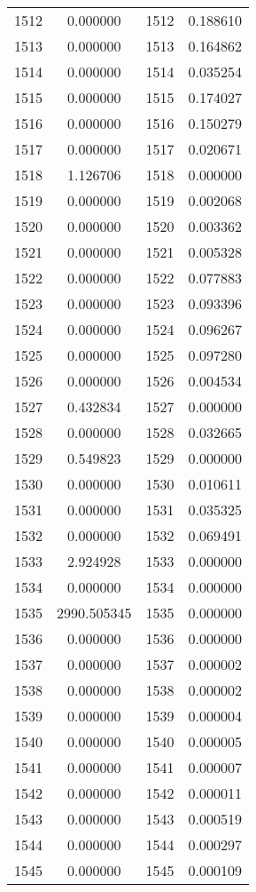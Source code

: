 \documentclass[12pt]{article}
\begin{document}
\begin{longtable}{@{}cccc@{}}
1512 & 0.000000 & 1512 & 0.188610 \\
1513 & 0.000000 & 1513 & 0.164862 \\
1514 & 0.000000 & 1514 & 0.035254 \\
1515 & 0.000000 & 1515 & 0.174027 \\
1516 & 0.000000 & 1516 & 0.150279 \\
1517 & 0.000000 & 1517 & 0.020671 \\
1518 & 1.126706 & 1518 & 0.000000 \\
1519 & 0.000000 & 1519 & 0.002068 \\
1520 & 0.000000 & 1520 & 0.003362 \\
1521 & 0.000000 & 1521 & 0.005328 \\
1522 & 0.000000 & 1522 & 0.077883 \\
1523 & 0.000000 & 1523 & 0.093396 \\
1524 & 0.000000 & 1524 & 0.096267 \\
1525 & 0.000000 & 1525 & 0.097280 \\
1526 & 0.000000 & 1526 & 0.004534 \\
1527 & 0.432834 & 1527 & 0.000000 \\
1528 & 0.000000 & 1528 & 0.032665 \\
1529 & 0.549823 & 1529 & 0.000000 \\
1530 & 0.000000 & 1530 & 0.010611 \\
1531 & 0.000000 & 1531 & 0.035325 \\
1532 & 0.000000 & 1532 & 0.069491 \\
1533 & 2.924928 & 1533 & 0.000000 \\
1534 & 0.000000 & 1534 & 0.000000 \\
1535 & 2990.505345 & 1535 & 0.000000 \\
1536 & 0.000000 & 1536 & 0.000000 \\
1537 & 0.000000 & 1537 & 0.000002 \\
1538 & 0.000000 & 1538 & 0.000002 \\
1539 & 0.000000 & 1539 & 0.000004 \\
1540 & 0.000000 & 1540 & 0.000005 \\
1541 & 0.000000 & 1541 & 0.000007 \\
1542 & 0.000000 & 1542 & 0.000011 \\
1543 & 0.000000 & 1543 & 0.000519 \\
1544 & 0.000000 & 1544 & 0.000297 \\
1545 & 0.000000 & 1545 & 0.000109 \\

\end{longtable}
\end{document}
